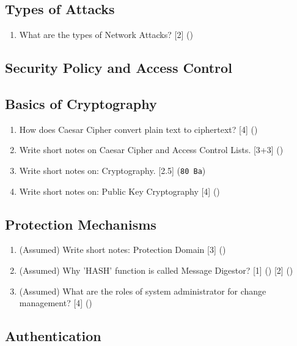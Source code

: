 \documentclass[12pt]{article}
\begin{document}
	\subsection{Types of Attacks}
		\begin{enumerate}
			\item What are the types of Network Attacks? \hfill [2] ()
		\end{enumerate}

	\subsection{Security Policy and Access Control}
	\subsection{Basics of Cryptography}
		\begin{enumerate}
			\item How does Caesar Cipher convert plain text to ciphertext? \hfill [4] ()

			\item Write short notes on Caesar Cipher and Access Control Lists. \hfill [3+3] ()

			\item Write short notes on: Cryptography. \hfill [2.5] (\texttt{80 Ba})

			\item Write short notes on: Public Key Cryptography \hfill [4] ()
		\end{enumerate}

	\subsection{Protection Mechanisms}
		\begin{enumerate}
			\item (Assumed) Write short notes: Protection Domain \hfill [3] ()

			\item (Assumed) Why 'HASH' function is called Message Digestor? \hfill [1] () [2] ()

			\item (Assumed) What are the roles of system administrator for change management? \hfill [4] ()
		\end{enumerate}

	\subsection{Authentication}
\end{document}
